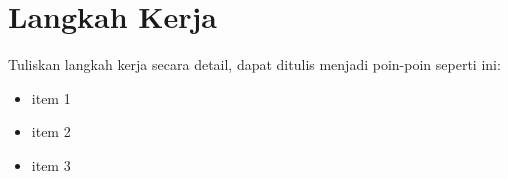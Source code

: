 \chapter{Langkah Kerja}

Tuliskan langkah kerja secara detail, dapat ditulis menjadi poin-poin seperti ini:
\begin{itemize}[noitemsep]
    \item item 1
    \item item 2
    \item item 3
\end{itemize}
